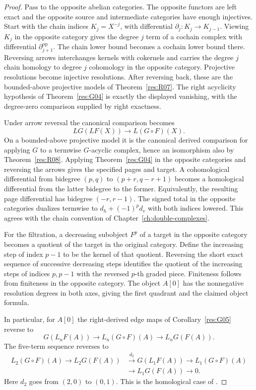 \begin{proof}
Pass to the opposite abelian categories. The opposite functors
are left exact and the opposite source and intermediate
categories have enough injectives. Start with the chain indices
\(K_j=X^{-j}\), with differential \(\partial_j:K_j\to K_{j-1}\).
Viewing \(K_j\) in the opposite category gives the degree \(j\)
term of a cochain complex with differential \(\partial_{j+1}^{\mathrm{op}}\).
The chain lower bound becomes a cochain lower bound there.
Reversing arrows interchanges kernels with cokernels and
carries the degree \(j\) chain homology to degree \(j\)
cohomology in the opposite category. Projective resolutions
become injective resolutions. After reversing back, these
are the bounded-above projective models of
Theorem~\ref{res:R07}. The right acyclicity hypothesis of
Theorem~\ref{res:G04} is exactly the displayed vanishing,
with the degree-zero comparison supplied by right exactness.

Under arrow reversal the canonical comparison becomes
\[
              LG(LF(X))\longrightarrow L(G\circ F)(X).
\]
On a bounded-above projective model it is the canonical
derived comparison for applying \(G\) to a termwise
\(G\)-acyclic complex, hence an isomorphism also by
Theorem~\ref{res:R08}. Applying Theorem~\ref{res:G04}
in the opposite categories and reversing the arrows gives
the specified pages and target. A cohomological differential
from bidegree \((p,q)\) to \((p+r,q-r+1)\) becomes a homological
differential from the latter bidegree to the former. Equivalently,
the resulting page differential has bidegree \((-r,r-1)\).
The signed total in the opposite categories dualizes termwise
to \(d_h+(-1)^p d_v\) with both indices lowered. This agrees with
the chain convention of Chapter~\ref{ch:double-complexes}.

For the filtration, a decreasing subobject \(F^p\) of a target
in the opposite category becomes a quotient of the target in
the original category. Define the increasing step of index \(p-1\)
to be the kernel of that quotient. Reversing the short exact
sequence of successive decreasing steps identifies the
quotient of the increasing steps of indices \(p,p-1\) with the
reversed \(p\)-th graded piece. Finiteness follows from
finiteness in the opposite category. The object \(A[0]\) has
the nonnegative resolution degrees in both axes, giving the
first quadrant and the claimed object formula.

In particular, for \(A[0]\) the right-derived edge maps of
Corollary~\ref{res:G05} reverse to
\[
 G(L_nF(A))\longrightarrow L_n(G\circ F)(A)
                     \longrightarrow L_nG(F(A)).
\]
The five-term sequence reverses to
\[
\begin{split}
 L_2(G\circ F)(A)\longrightarrow L_2G(F(A))
 &\xrightarrow{d_2}G(L_1F(A))
 \longrightarrow L_1(G\circ F)(A)\\
 &\longrightarrow L_1G(F(A))\longrightarrow0 .
\end{split}
\]
Here \(d_2\) goes from \((2,0)\) to \((0,1)\). This is the
homological case of \cite[Corollary 5.8.4]{weibel}.
\end{proof}
